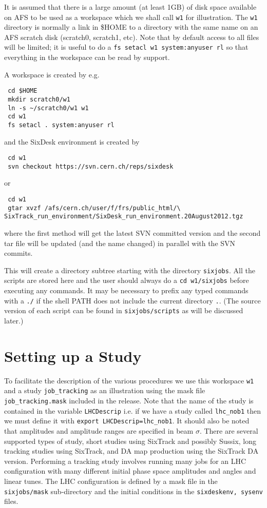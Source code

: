 \documentclass{cernatsnote}    %
\begin{document}
It is assumed that there is a large amount (at least 1GB) of disk space
available on AFS to be used as a workspace which we shall call
{\tt w1} for illustration. The {\tt w1} directory is normally a link in \$HOME
to a directory with the same name on an AFS scratch disk (scratch0, scratch1, etc).
Note that by default access to all files will be limited; it is useful
to do a {\tt fs setacl w1 system:anyuser rl} so that everything in the workspace can
be read by support.

A workspace is created by e.g. 
\begin{verbatim}
 cd $HOME
 mkdir scratch0/w1
 ln -s ~/scratch0/w1 w1 
 cd w1
 fs setacl . system:anyuser rl
\end{verbatim}
and the SixDesk environment is created by 
\begin{verbatim}
 cd w1
 svn checkout https://svn.cern.ch/reps/sixdesk
\end{verbatim}
or
\begin{verbatim}
 cd w1
 gtar xvzf /afs/cern.ch/user/f/frs/public_html/\
SixTrack_run_environment/SixDesk_run_environment.20August2012.tgz
\end{verbatim}
where the first method will get the latest SVN committed version
and the second tar file will be updated (and the name changed)
in parallel with the SVN commits. 

This will create a directory subtree starting with
the directory {\tt sixjobs}. All the scripts are stored here
and the user should always do a
{\tt cd w1/sixjobs} before executing any commands. It may be
necessary to prefix any typed commands with a {\tt ./} if the
shell PATH does not include the current directory {\tt .}. 
(The source version of each script can be found
in {\tt sixjobs/scripts} as will be discussed later.)

\section{Setting up a Study}
To facilitate the description of the various procedures we use this workspace
{\tt w1} and a study {\tt job\_tracking} as an illustration using the mask
file {\tt job\_tracking.mask} included in the release. Note that the name of the
study is contained in the variable {\tt LHCDescrip} i.e. if we have a study
called {\tt lhc\_nob1} then we must define it 
with {\tt export LHCDescrip=lhc\_nob1}. It should also be noted that amplitudes
and amplitude ranges are specified in beam $\sigma$.
There are several supported types of study, short studies using SixTrack and possibly
Sussix, long tracking studies using SixTrack, and DA map production using the SixTrack DA version.
Performing a tracking study involves running many jobs for an LHC configuration with
many different initial phase space amplitudes and angles and linear tunes. The LHC configuration is
defined by a mask file in the {\tt sixjobs/mask} sub-directory and the initial
conditions in the {\tt sixdeskenv, sysenv} files.
\end{document}
